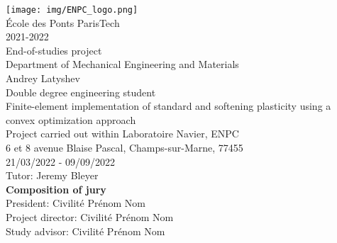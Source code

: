 \documentclass[12pt]{article}
\begin{document}
\begin{titlepage}
	{
        \center
	    \texttt{[image: img/ENPC\_logo.png]}\\[.44cm]
	    {\large École des Ponts ParisTech}\\[0.2cm]
	    {\normalsize 2021-2022}\\[.64cm]

	    {\Large End-of-studies project}\\[.5cm]
        {\large Department of Mechanical Engineering and Materials}\\[.85cm]
        {\Large Andrey Latyshev}\\[1cm]    
        {\large Double degree engineering student}\\[.85cm]

        {\Large Finite-element implementation of standard and softening plasticity using a convex optimization approach}\\[1cm]
        {\normalsize Project carried out within Laboratoire Navier, ENPC}\\[0.2cm]
	    {\normalsize 6 et 8 avenue Blaise Pascal, Champs-sur-Marne, 77455}\\[0.2cm]
        {\normalsize 21/03/2022 - 09/09/2022}\\[1.1cm]

        {\large Tutor: Jeremy Bleyer}\\[1.1cm]
    }
    \noindent \textbf{\normalsize Composition of jury}\\
    {\normalsize President: Civilité Prénom Nom}\\
    {\normalsize Project director: Civilité Prénom Nom}\\
    {\normalsize Study advisor: Civilité Prénom Nom}
\end{titlepage}


\end{document}
